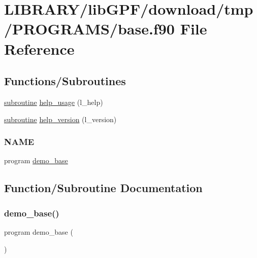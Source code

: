 \hypertarget{base_8f90}{}\section{L\+I\+B\+R\+A\+R\+Y/lib\+G\+P\+F/download/tmp/\+P\+R\+O\+G\+R\+A\+M\+S/base.f90 File Reference}
\label{base_8f90}
\subsection*{Functions/\+Subroutines}
\begin{DoxyCompactItemize}
\item 
\hyperlink{M__stopwatch_83_8txt_acfbcff50169d691ff02d4a123ed70482}{subroutine} \hyperlink{base_8f90_a3e09a3b52ee8fb04eeb93fe5761626a8}{help\+\_\+usage} (l\+\_\+help)
\item 
\hyperlink{M__stopwatch_83_8txt_acfbcff50169d691ff02d4a123ed70482}{subroutine} \hyperlink{base_8f90_a39c21619b08a3c22f19e2306efd7f766}{help\+\_\+version} (l\+\_\+version)
\begin{DoxyCompactList}\small\item\em \subsubsection*{N\+A\+ME}\end{DoxyCompactList}\item 
program \hyperlink{base_8f90_aeacab8d1e6bcb1553d1ff3d04b88f44c}{demo\+\_\+base}
\end{DoxyCompactItemize}


\subsection{Function/\+Subroutine Documentation}
\mbox{\label{base_8f90_aeacab8d1e6bcb1553d1ff3d04b88f44c}} 
\subsubsection{\texorpdfstring{demo\+\_\+base()}{demo\_base()}}
{\footnotesize\ttfamily program demo\+\_\+base (\begin{DoxyParamCaption}{ }\end{DoxyParamCaption})}



